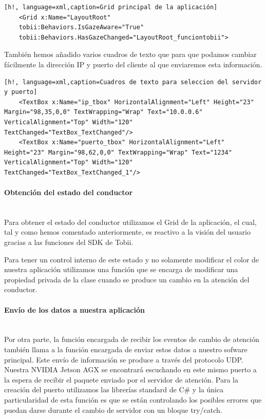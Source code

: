\begin{lstlisting}[h!, language=xml,caption=Grid principal de la aplicación]
    <Grid x:Name="LayoutRoot" 
    tobii:Behaviors.IsGazeAware="True"
    tobii:Behaviors.HasGazeChanged="LayoutRoot_funciontobii">
\end{lstlisting}

También hemos añadido varios cuadros de texto que para que podamos cambiar fácilmente la dirección IP y puerto del cliente al que enviaremos esta información.

\begin{lstlisting}[h!, language=xml,caption=Cuadros de texto para seleccion del servidor y puerto]
    <TextBox x:Name="ip_tbox" HorizontalAlignment="Left" Height="23" Margin="98,35,0,0" TextWrapping="Wrap" Text="10.0.0.6" VerticalAlignment="Top" Width="120" TextChanged="TextBox_TextChanged"/>
    <TextBox x:Name="puerto_tbox" HorizontalAlignment="Left" Height="23" Margin="98,62,0,0" TextWrapping="Wrap" Text="1234" VerticalAlignment="Top" Width="120" TextChanged="TextBox_TextChanged_1"/>
\end{lstlisting}


\paragraph{Obtención del estado del conductor}\mbox{}\\
Para obtener el estado del conductor utilizamos el Grid de la aplicación, el cual, tal y como hemos comentado anteriormente, es reactivo a la visión del usuario gracias a las funciones del SDK de Tobii.

Para tener un control interno de este estado y no solamente modificar el color de nuestra aplicación utilizamos una función que se encarga de modificar una propiedad privada de la clase cuando se produce un cambio en la atención del conductor.



\paragraph{Envío de los datos a nuestra aplicación}\mbox{}\\
Por otra parte, la función encargada de recibir los eventos de cambio de atención también llama a la función encargada de enviar estos datos a nuestro sofware principal.
Este envío de información se produce a través del protocolo UDP. Nuestra NVIDIA Jetson AGX se encontrará escuchando en este mismo puerto a la espera de recibir el paquete enviado por el servidor de atención.
Para la creación del puerto utilizamos las librerías standard de C\# y la única particularidad de esta función es que se están controlando los posibles errores que puedan darse durante el cambio de servidor con un bloque try/catch.



